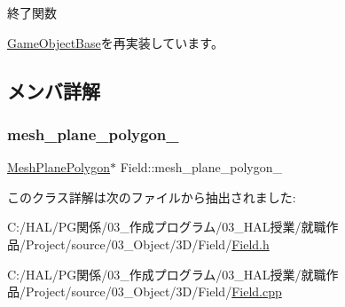 終了関数 



\mbox{\hyperlink{class_game_object_base_a97e1bc277d7b1c0156d4735de29a022c}{Game\+Object\+Base}}を再実装しています。



\subsection{メンバ詳解}
\mbox{\label{class_field_a5c4ad4d2fea2269e7ab2185cf09beb10}} 
\subsubsection{\texorpdfstring{mesh\+\_\+plane\+\_\+polygon\+\_\+}{mesh\_plane\_polygon\_}}
{\footnotesize\ttfamily \mbox{\hyperlink{class_mesh_plane_polygon}{Mesh\+Plane\+Polygon}}$\ast$ Field\+::mesh\+\_\+plane\+\_\+polygon\+\_\+}



このクラス詳解は次のファイルから抽出されました\+:\begin{DoxyCompactItemize}
\item 
C\+:/\+H\+A\+L/\+P\+G関係/03\+\_\+作成プログラム/03\+\_\+\+H\+A\+L授業/就職作品/\+Project/source/03\+\_\+\+Object/3\+D/\+Field/\mbox{\hyperlink{_field_8h}{Field.\+h}}\item 
C\+:/\+H\+A\+L/\+P\+G関係/03\+\_\+作成プログラム/03\+\_\+\+H\+A\+L授業/就職作品/\+Project/source/03\+\_\+\+Object/3\+D/\+Field/\mbox{\hyperlink{_field_8cpp}{Field.\+cpp}}\end{DoxyCompactItemize}
